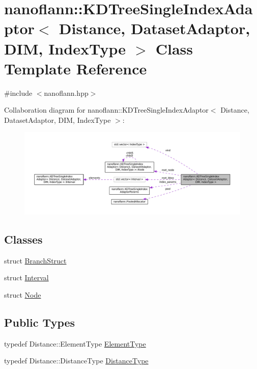 \hypertarget{classnanoflann_1_1_k_d_tree_single_index_adaptor}{\section{nanoflann\-:\-:K\-D\-Tree\-Single\-Index\-Adaptor$<$ Distance, Dataset\-Adaptor, D\-I\-M, Index\-Type $>$ Class Template Reference}
\label{classnanoflann_1_1_k_d_tree_single_index_adaptor}
}


{\ttfamily \#include $<$nanoflann.\-hpp$>$}



Collaboration diagram for nanoflann\-:\-:K\-D\-Tree\-Single\-Index\-Adaptor$<$ Distance, Dataset\-Adaptor, D\-I\-M, Index\-Type $>$\-:\nopagebreak
\begin{figure}[H]
\begin{center}
\leavevmode
\includegraphics[width=350pt]{classnanoflann_1_1_k_d_tree_single_index_adaptor__coll__graph}
\end{center}
\end{figure}
\subsection*{Classes}
\begin{DoxyCompactItemize}
\item 
struct \hyperlink{structnanoflann_1_1_k_d_tree_single_index_adaptor_1_1_branch_struct}{Branch\-Struct}
\item 
struct \hyperlink{structnanoflann_1_1_k_d_tree_single_index_adaptor_1_1_interval}{Interval}
\item 
struct \hyperlink{structnanoflann_1_1_k_d_tree_single_index_adaptor_1_1_node}{Node}
\end{DoxyCompactItemize}
\subsection*{Public Types}
\begin{DoxyCompactItemize}
\item 
typedef Distance\-::\-Element\-Type \hyperlink{classnanoflann_1_1_k_d_tree_single_index_adaptor_a21652a3919382d558291f80cefad8770}{Element\-Type}
\item 
typedef Distance\-::\-Distance\-Type \hyperlink{classnanoflann_1_1_k_d_tree_single_index_adaptor_addc764e7c19cc85c89b3903338e5a910}{Distance\-Type}
\end{DoxyCompactItemize}
